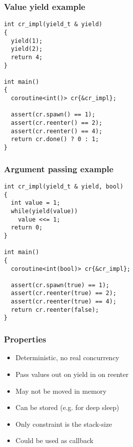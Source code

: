 \documentclass{beamer}
\begin{document}

\begin{frame}[fragile]
\frametitle{Value yield example}
\vspace*{-3ex}
\begin{block}{\vspace*{-3.2ex}}
\begin{lstlisting}[basicstyle=\small]
int cr_impl(yield_t & yield) 
{
  yield(1);
  yield(2);
  return 4;  
}

int main() 
{
  coroutine<int()> cr{&cr_impl};
  
  assert(cr.spawn() == 1);
  assert(cr.reenter() == 2);
  assert(cr.reenter() == 4);
  return cr.done() ? 0 : 1;
}
\end{lstlisting}

\end{block}
\end{frame}

\begin{frame}[fragile]
\frametitle{Argument passing example}
\vspace*{-3ex}
\begin{block}{\vspace*{-3.2ex}}
\begin{lstlisting}[basicstyle=\small]
int cr_impl(yield_t & yield, bool) 
{
  int value = 1;
  while(yield(value))
    value <<= 1;
  return 0;
}

int main() 
{
  coroutine<int(bool)> cr{&cr_impl};
  
  assert(cr.spawn(true) == 1);
  assert(cr.reenter(true) == 2);
  assert(cr.reenter(true) == 4);
  return cr.reenter(false);
}
\end{lstlisting}
\end{block}
\end{frame}

\begin{frame}
\frametitle{Properties}
\begin{itemize}
\item<1-> Deterministic, no real concurrency
\item<2-> Pass values out on yield in on reenter
\item<3-> May not be moved in memory
\item<4-> Can be stored (e.g. for deep sleep)
\item<5-> Only constraint is the stack-size
\item<6-> Could be used as callback
\end{itemize}
\end{frame}
\end{document}
